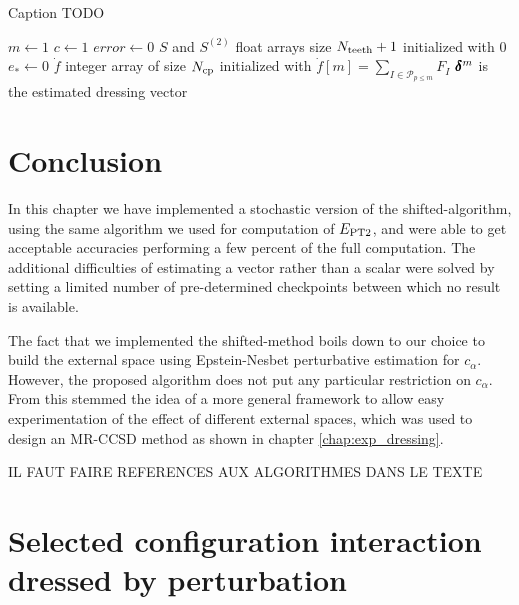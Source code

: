 \documentclass[./thesis.tex]{subfiles}
\begin{document}
\begin{algorithm}
        \caption{\alert{Caption TODO}}
	$m \gets 1$ \;
	$c \gets 1$ \;
	$error \gets 0$ \;
	$S$ and $S^{(2)}$ float arrays size $N_\text{teeth}+1$ initialized with $0$ \;
	$e_* \gets 0$ \;
	$\dot f$ integer array of size ${N_\text{cp}}$ initialized with $\dot f[m] = \sum_{I \in \mathcal{P}_{p\leq m}} F_{I}$ \;
	$\pmb \delta^m$ is the estimated dressing vector \;
	
\end{algorithm}


\section{Conclusion}

In this chapter we have implemented a stochastic version of the shifted-\Bk algorithm, using the same algorithm we used for computation of $E_\text{PT2}$, and were able to get acceptable accuracies performing a few percent of the full computation.
The additional difficulties of estimating a vector rather than a scalar were solved by setting a limited number of pre-determined checkpoints between which no result is available.

The fact that we implemented the shifted-\Bk method boils down to our choice to build the external space using Epstein-Nesbet perturbative estimation for $c_\alpha$. However, the proposed algorithm does not put any particular restriction on $c_\alpha$. From this stemmed the idea of a more general framework to allow easy experimentation of the effect of different external spaces, which was used to design an MR-CCSD method as shown in chapter \ref{chap:exp_dressing}.

\alert{IL FAUT FAIRE REFERENCES AUX ALGORITHMES DANS LE TEXTE}


\clearpage
\section{Selected configuration interaction dressed by perturbation}
\label{sec:matrix_article}



\end{document}
